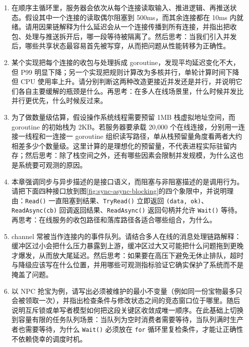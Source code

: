 \begin{tcolorbox}[breakable]
\begin{enumerate}
    \item 在顺序主循环里，服务器会依次从每个连接读取输入、推进逻辑、再推送状态。假设其中一个连接的读取偶尔阻塞到 500ms，而其余连接都在 10ms 内就绪。请用因果链解释为什么延迟会从一个连接传播到所有连接，并指出把收包、处理与推送拆开后，哪一段等待被隔离了。然后思考：当我们引入并发后，哪些共享状态最容易首先被写穿，从而把问题从性能转移为正确性。

    \item 某个实现把每个连接的收包与处理拆成 goroutine，发现平均延迟变化不大，但 P99 明显下降；另一个实现把规则计算改为多核并行，单轮计算时间下降但 CPU 使用率上升。请分别判断这两种改造更接近并发还是并行，并说明它们各自主要缓解的瓶颈是什么。再思考：在多人在线场景里，什么时候并发比并行更优先，什么时候反过来。

    \item 为了做数量级估算，假设操作系统线程需要预留 1MB 栈虚拟地址空间，而 goroutine 的初始栈为 2KB。若服务器要承载 20,000 个在线连接，分别用一连接一线程和一连接一 goroutine 组织读写路径，单从栈预留量角度看两者大约相差多少个数量级。这里计算的是理想化的预留量，不代表进程实际驻留内存；然后思考：除了栈空间之外，还有哪些因素会限制并发规模，为什么这也是系统要可观测的原因。

    \item 本章强调同步与异步描述的是接口语义，而阻塞与非阻塞描述的是调用行为。请把下面四种接口放到图\ref{fig:sync-async-blocking}的四个象限中，并说明理由：\texttt{Read()} 一直阻塞到结果、\texttt{TryRead()} 立即返回 \texttt{(data, ok)}、\texttt{ReadAsync(cb)} 回调返回结果、\texttt{ReadAsync()} 返回句柄并允许 \texttt{Wait()} 等待。再思考：在线服务的收包路径和落库路径各适合哪些组合，为什么。

    \item channel 常被当作连接内的事件队列。请结合多人在线的消息处理链路解释：缓冲区过小会把什么压力暴露到上游，缓冲区过大又可能把什么问题拖到更晚才爆发，从而放大尾延迟。然后思考：如果要在高压下避免无休止排队，超时与降级应该写在什么位置，并用哪些可观测指标验证它确实保护了系统而不是掩盖了问题。

    \item 以 NPC 抢宝为例，请写出必须被维护的最小不变量（例如同一份宝物最多只会被领取一次），并指出检查条件与修改状态之间的竞态窗口位于哪里。随后说明互斥锁或单写者模型如何把这段关键区收敛成唯一顺序。在此基础上切换到容量有限的任务队列场景：当队列为空时消费者需要等待，当队列满时生产者也需要等待，为什么 \texttt{Wait()} 必须放在 \texttt{for} 循环里复检条件，才能让正确性不依赖侥幸的调度时机。


\end{enumerate}
\end{tcolorbox}
